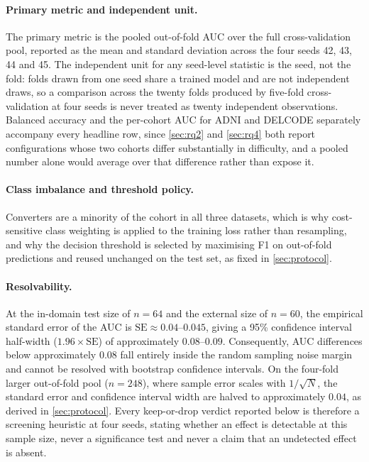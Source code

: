\paragraph{Primary metric and independent unit.} The primary metric is the pooled
out-of-fold \ac{AUC} over the full cross-validation pool, reported as the mean and
standard deviation across the four seeds 42, 43, 44 and 45. The independent unit for any
seed-level statistic is the seed, not the fold: folds drawn from one seed share a trained
model and are not independent draws, so a comparison across the twenty folds produced by
five-fold cross-validation at four seeds is never treated as twenty independent
observations. Balanced accuracy and the per-cohort \ac{AUC} for \ac{ADNI} and \ac{DELCODE}
separately accompany every headline row, since \autoref{sec:rq2} and \autoref{sec:rq4}
both report configurations whose two cohorts differ substantially in difficulty, and a pooled number
alone would average over that difference rather than expose it.

\paragraph{Class imbalance and threshold policy.} Converters are a minority of the cohort
in all three datasets, which is why cost-sensitive class weighting is applied to the
training loss rather than resampling, and why the decision threshold is selected by
maximising F1 on out-of-fold predictions and reused unchanged on the test set, as fixed in
\autoref{sec:protocol}.

\paragraph{Resolvability.} At the in-domain test size of $n=64$ and the external size of $n=60$, the empirical standard error of the \ac{AUC} is $\text{SE} \approx 0.04\text{--}0.045$, giving a 95\% confidence interval half-width ($1.96 \times \text{SE}$) of approximately $0.08\text{--}0.09$. Consequently, \ac{AUC} differences below approximately $0.08$ fall entirely inside the random sampling noise margin and cannot be resolved with bootstrap confidence intervals. On the four-fold larger out-of-fold pool ($n=248$), where sample error scales with $1/\sqrt{N}$, the standard error and confidence interval width are halved to approximately $0.04$, as derived in \autoref{sec:protocol}. Every keep-or-drop verdict reported below is therefore a screening heuristic at four seeds, stating whether an effect is detectable at this sample size, never a significance test and never a claim that an undetected effect is absent.

